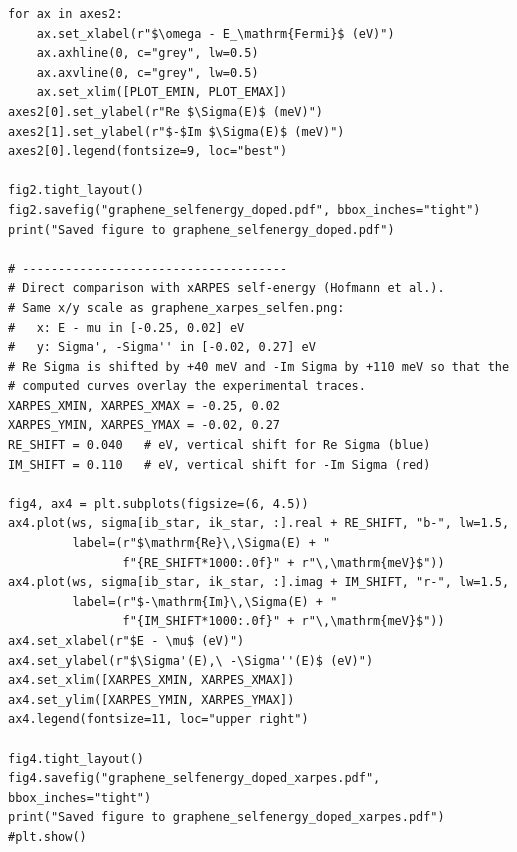 \documentclass[a4paper,11pt,serif]{article}
\begin{document}
\begin{scriptsize}
\begin{Verbatim}[frame=single]
for ax in axes2:
    ax.set_xlabel(r"$\omega - E_\mathrm{Fermi}$ (eV)")
    ax.axhline(0, c="grey", lw=0.5)
    ax.axvline(0, c="grey", lw=0.5)
    ax.set_xlim([PLOT_EMIN, PLOT_EMAX])
axes2[0].set_ylabel(r"Re $\Sigma(E)$ (meV)")
axes2[1].set_ylabel(r"$-$Im $\Sigma(E)$ (meV)")
axes2[0].legend(fontsize=9, loc="best")

fig2.tight_layout()
fig2.savefig("graphene_selfenergy_doped.pdf", bbox_inches="tight")
print("Saved figure to graphene_selfenergy_doped.pdf")

# -------------------------------------
# Direct comparison with xARPES self-energy (Hofmann et al.).
# Same x/y scale as graphene_xarpes_selfen.png:
#   x: E - mu in [-0.25, 0.02] eV
#   y: Sigma', -Sigma'' in [-0.02, 0.27] eV
# Re Sigma is shifted by +40 meV and -Im Sigma by +110 meV so that the
# computed curves overlay the experimental traces.
XARPES_XMIN, XARPES_XMAX = -0.25, 0.02
XARPES_YMIN, XARPES_YMAX = -0.02, 0.27
RE_SHIFT = 0.040   # eV, vertical shift for Re Sigma (blue)
IM_SHIFT = 0.110   # eV, vertical shift for -Im Sigma (red)

fig4, ax4 = plt.subplots(figsize=(6, 4.5))
ax4.plot(ws, sigma[ib_star, ik_star, :].real + RE_SHIFT, "b-", lw=1.5,
         label=(r"$\mathrm{Re}\,\Sigma(E) + "
                f"{RE_SHIFT*1000:.0f}" + r"\,\mathrm{meV}$"))
ax4.plot(ws, sigma[ib_star, ik_star, :].imag + IM_SHIFT, "r-", lw=1.5,
         label=(r"$-\mathrm{Im}\,\Sigma(E) + "
                f"{IM_SHIFT*1000:.0f}" + r"\,\mathrm{meV}$"))
ax4.set_xlabel(r"$E - \mu$ (eV)")
ax4.set_ylabel(r"$\Sigma'(E),\ -\Sigma''(E)$ (eV)")
ax4.set_xlim([XARPES_XMIN, XARPES_XMAX])
ax4.set_ylim([XARPES_YMIN, XARPES_YMAX])
ax4.legend(fontsize=11, loc="upper right")

fig4.tight_layout()
fig4.savefig("graphene_selfenergy_doped_xarpes.pdf", bbox_inches="tight")
print("Saved figure to graphene_selfenergy_doped_xarpes.pdf")
#plt.show()
\end{Verbatim}
\end{scriptsize}
\end{document}
